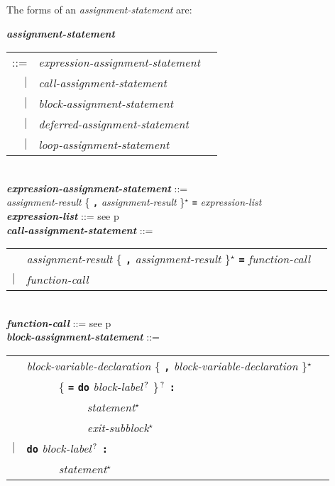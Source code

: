 \documentclass[12pt]{article}
\newcommand{\TT}[1]{{\tt \bfseries #1}}
\newcommand{\STAR}{{\Large $^\star$}}
\newcommand{\QMARK}{{$^{\,\mbox{\footnotesize ?}}$}}
\newcommand{\ttkey}[1]{{\tt \bfseries #1}}
\newcommand{\emkey}[1]{{\em \bfseries #1}}
\newcommand{\pagref}[1]{p\pageref{#1}}
\newenvironment{indpar}[1][0.3in]%
	{\begin{list}{}%
		     {\setlength{\itemsep}{0in}%
		      \setlength{\topsep}{0in}%
		      \setlength{\parsep}{1ex}%
		      \setlength{\labelwidth}{#1}%
		      \setlength{\leftmargin}{#1}%
		      \addtolength{\leftmargin}{\labelsep}}%
	 \item}%
	{\end{list}}
\begin{document}
The forms of an {\em assignment-statement} are:
\begin{indpar}
\emkey{assignment-statement}
    \begin{tabular}[t]{@{}rll}
    ::= & {\em expression-assignment-statement} \\
    $|$ & {\em call-assignment-statement} \\
    $|$ & {\em block-assignment-statement} \\
    $|$ & {\em deferred-assignment-statement} \\
    $|$ & {\em loop-assignment-statement} \\
    \end{tabular}
\\[0.5ex]
\emkey{expression-assignment-statement} ::= \\
\hspace*{0.5in} {\em assignment-result}
                \{ \TT{,} {\em assignment-result} \}\STAR{}
		\TT{=} {\em expression-list}
\\[0.5ex]
\emkey{expression-list} ::= see \pagref{EXPRESSION-LIST}
\\[0.5ex]
\emkey{call-assignment-statement} ::= \\
\hspace*{0.5in}
    \begin{tabular}[t]{@{}rll}
        & {\em assignment-result}
                \{ \TT{,} {\em assignment-result} \}\STAR{}
		\TT{=} {\em function-call} \\
    $|$ & {\em function-call} \\
    \end{tabular}
\\[0.5ex]
\emkey{function-call} ::= see \pagref{FUNCTION-CALLS}
\\[0.5ex]
\emkey{block-assignment-statement} ::= \\
\hspace*{0.5in}
    \begin{tabular}[t]{@{}rll}
        & {\em block-variable-declaration}
                \{ \TT{,} {\em block-variable-declaration} \}\STAR{} \\
	& ~~~~~ \{ \TT{=} \ttkey{do} {\em block-label}\QMARK{} \}\QMARK{}
		   \TT{:} \\
        & ~~~~~~~~~~ {\em statement}\STAR{} \\
        & ~~~~~~~~~~ {\em exit-subblock}\STAR{} \\
    $|$ & \ttkey{do} {\em block-label}\QMARK{} \TT{:} \\
        & ~~~~~ {\em statement}\STAR{} \\

\end{tabular}
\end{indpar}
\end{document}
